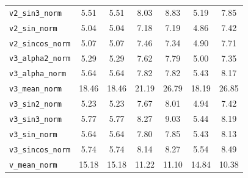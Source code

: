 \documentclass{article}
\begin{document}
\begin{longtable}{l cccccc}
\texttt{v2\_sin3\_norm} & 5.51 & 5.51 & 8.03 & 8.83 & 5.19 & 7.85 \\
\texttt{v2\_sin\_norm} & 5.04 & 5.04 & 7.18 & 7.19 & 4.86 & 7.42 \\
\texttt{v2\_sincos\_norm} & 5.07 & 5.07 & 7.46 & 7.34 & 4.90 & 7.71 \\
\texttt{v3\_alpha2\_norm} & 5.29 & 5.29 & 7.62 & 7.79 & 5.00 & 7.35 \\
\texttt{v3\_alpha\_norm} & 5.64 & 5.64 & 7.82 & 7.82 & 5.43 & 8.17 \\
\texttt{v3\_mean\_norm} & 18.46 & 18.46 & 21.19 & 26.79 & 18.19 & 26.85 \\
\texttt{v3\_sin2\_norm} & 5.23 & 5.23 & 7.67 & 8.01 & 4.94 & 7.42 \\
\texttt{v3\_sin3\_norm} & 5.77 & 5.77 & 8.27 & 9.03 & 5.44 & 8.19 \\
\texttt{v3\_sin\_norm} & 5.64 & 5.64 & 7.80 & 7.85 & 5.43 & 8.13 \\
\texttt{v3\_sincos\_norm} & 5.74 & 5.74 & 8.14 & 8.27 & 5.54 & 8.49 \\
\texttt{v\_mean\_norm} & 15.18 & 15.18 & 11.22 & 11.10 & 14.84 & 10.38 \\
\end{longtable}
\end{document}
